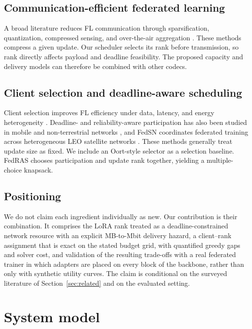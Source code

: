 \documentclass[preprint,12pt]{elsarticle}
\begin{document}
\subsection{Communication-efficient federated learning}
A broad literature reduces FL communication through sparsification, quantization, compressed sensing, and over-the-air aggregation \cite{oh2023fedqcs,oh2024fedvqcs,liu2023adaptivequant,kim2023beamforming,reisizadeh2020fedpaq,lin2018deep}. These methods compress a given update. Our scheduler selects its rank before transmission, so rank directly affects payload and deadline feasibility. The proposed capacity and delivery models can therefore be combined with other codecs.

\subsection{Client selection and deadline-aware scheduling}
Client selection improves FL efficiency under data, latency, and energy heterogeneity \cite{oort2021oort,chen2024clientselection,dong2024aoi,luo2021costeffective}. Deadline- and reliability-aware participation has also been studied in mobile and non-terrestrial networks \cite{razmi2022ground,tang2023flsagin,qin2024dfrl,ribero2023intermittent,han2024orchestrating}, and FedSN coordinates federated training across heterogeneous LEO satellite networks \cite{lin2025fedsn}. These methods generally treat update size as fixed. We include an Oort-style selector as a selection baseline. FedRAS chooses participation and update rank together, yielding a multiple-choice knapsack.

\subsection{Positioning}
We do not claim each ingredient individually as new. Our contribution is their combination. It comprises the LoRA rank treated as a deadline-constrained network resource with an explicit MB-to-Mbit delivery hazard, a client--rank assignment that is exact on the stated budget grid, with quantified greedy gaps and solver cost, and validation of the resulting trade-offs with a real federated trainer in which adapters are placed on every block of the backbone, rather than only with synthetic utility curves. The claim is conditional on the surveyed literature of Section~\ref{sec:related} and on the evaluated setting.

\section{System model}
\label{sec:model}
\end{document}
